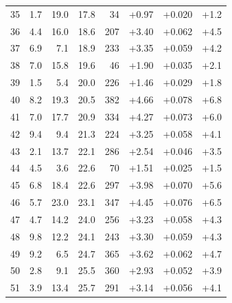 \begin{longtable}{@{}r r r r r r r r@{}}
35 & 1.7 & 19.0 & 17.8 & 34 & \cellcolor{green!21}+0.97 & \cellcolor{yellow!22}+0.020 & \cellcolor{orange!20}+1.2 \\
36 & 4.4 & 16.0 & 18.6 & 207 & \cellcolor{green!46}+3.40 & \cellcolor{yellow!47}+0.062 & \cellcolor{orange!42}+4.5 \\
37 & 6.9 & 7.1 & 18.9 & 233 & \cellcolor{green!45}+3.35 & \cellcolor{yellow!46}+0.059 & \cellcolor{orange!40}+4.2 \\
38 & 7.0 & 15.8 & 19.6 & 46 & \cellcolor{green!30}+1.90 & \cellcolor{yellow!31}+0.035 & \cellcolor{orange!26}+2.1 \\
39 & 1.5 & 5.4 & 20.0 & 226 & \cellcolor{green!26}+1.46 & \cellcolor{yellow!28}+0.029 & \cellcolor{orange!24}+1.8 \\
40 & 8.2 & 19.3 & 20.5 & 382 & \cellcolor{green!59}+4.66 & \cellcolor{yellow!57}+0.078 & \cellcolor{orange!58}+6.8 \\
41 & 7.0 & 17.7 & 20.9 & 334 & \cellcolor{green!55}+4.27 & \cellcolor{yellow!54}+0.073 & \cellcolor{orange!53}+6.0 \\
42 & 9.4 & 9.4 & 21.3 & 224 & \cellcolor{green!44}+3.25 & \cellcolor{yellow!45}+0.058 & \cellcolor{orange!40}+4.1 \\
43 & 2.1 & 13.7 & 22.1 & 286 & \cellcolor{green!37}+2.54 & \cellcolor{yellow!38}+0.046 & \cellcolor{orange!35}+3.5 \\
44 & 4.5 & 3.6 & 22.6 & 70 & \cellcolor{green!26}+1.51 & \cellcolor{yellow!26}+0.025 & \cellcolor{orange!22}+1.5 \\
45 & 6.8 & 18.4 & 22.6 & 297 & \cellcolor{green!52}+3.98 & \cellcolor{yellow!52}+0.070 & \cellcolor{orange!50}+5.6 \\
46 & 5.7 & 23.0 & 23.1 & 347 & \cellcolor{green!57}+4.45 & \cellcolor{yellow!55}+0.076 & \cellcolor{orange!56}+6.5 \\
47 & 4.7 & 14.2 & 24.0 & 256 & \cellcolor{green!44}+3.23 & \cellcolor{yellow!45}+0.058 & \cellcolor{orange!41}+4.3 \\
48 & 9.8 & 12.2 & 24.1 & 243 & \cellcolor{green!45}+3.30 & \cellcolor{yellow!46}+0.059 & \cellcolor{orange!41}+4.3 \\
49 & 9.2 & 6.5 & 24.7 & 365 & \cellcolor{green!48}+3.62 & \cellcolor{yellow!47}+0.062 & \cellcolor{orange!44}+4.7 \\
50 & 2.8 & 9.1 & 25.5 & 360 & \cellcolor{green!41}+2.93 & \cellcolor{yellow!41}+0.052 & \cellcolor{orange!39}+3.9 \\
51 & 3.9 & 13.4 & 25.7 & 291 & \cellcolor{green!43}+3.14 & \cellcolor{yellow!43}+0.056 & \cellcolor{orange!40}+4.1 \\

\end{longtable}
